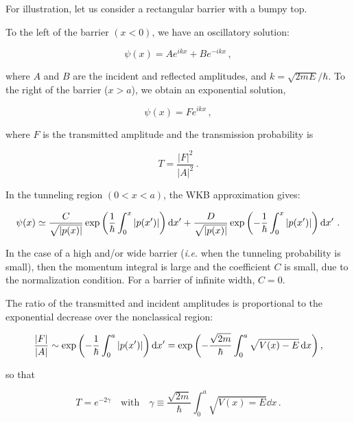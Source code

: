 \documentclass[12pt, titlepage]{article}
\begin{document}
For illustration, let us consider a rectangular barrier with a bumpy top. 


To the left of the barrier $(x<0)$, we have an oscillatory solution:

\begin{equation}
	\psi(x) = Ae^{ikx} + Be^{-ikx} \,,
\end{equation} 

where $A$ and $B$ are the incident and reflected amplitudes, and $k = \sqrt{2mE}/\hbar$. To the right of the barrier ($x>a$), we obtain an exponential solution,

\begin{equation}
	\psi(x) = Fe^{ikx} \,,
\end{equation}

where $F$ is the transmitted amplitude and the transmission probability is

\begin{equation}
	T = \frac{|F|^2}{|A|^2} \,.
\end{equation}

In the tunneling region $(0<x<a)$, the WKB approximation gives:

\begin{equation}
	\psi(x) \simeq \frac{C}{\sqrt{|p(x)|}}\exp\qty(\frac{1}{\hbar}\int_{0}^{x}|p(x^\prime)|)\dd{x^\prime} + \frac{D}{\sqrt{|p(x)|}}\exp\qty(-\frac{1}{\hbar}\int_{0}^{x}|p(x^\prime)|)\dd{x^\prime} \,.
\end{equation}

In the case of a high and/or wide barrier (\textit{i.e.} when the tunneling probability is small), then the momentum integral is large and the coefficient $C$ is small, due to the normalization condition. For a barrier of infinite width, $C=0$.


The ratio of the transmitted and incident amplitudes is proportional to the exponential decrease over the nonclassical region:

\begin{equation*}
	\frac{|F|}{|A|} \sim \exp\qty(-\frac{1}{\hbar}\int_{0}^{a}|p(x^\prime)|)\dd{x^\prime} = \exp\qty(-\frac{\sqrt{2m}}{\hbar}\int_{0}^{a}\sqrt{V(x) - E}\dd{x}) \,,
\end{equation*}

so that 

\begin{equation}
	T = e^{-2\gamma} \quad\text{with}\quad \gamma \equiv \frac{\sqrt{2m}}{\hbar}\int_{0}^{a}\sqrt{V(x) = E}\dd{x} \,.
\end{equation}
\end{document}
